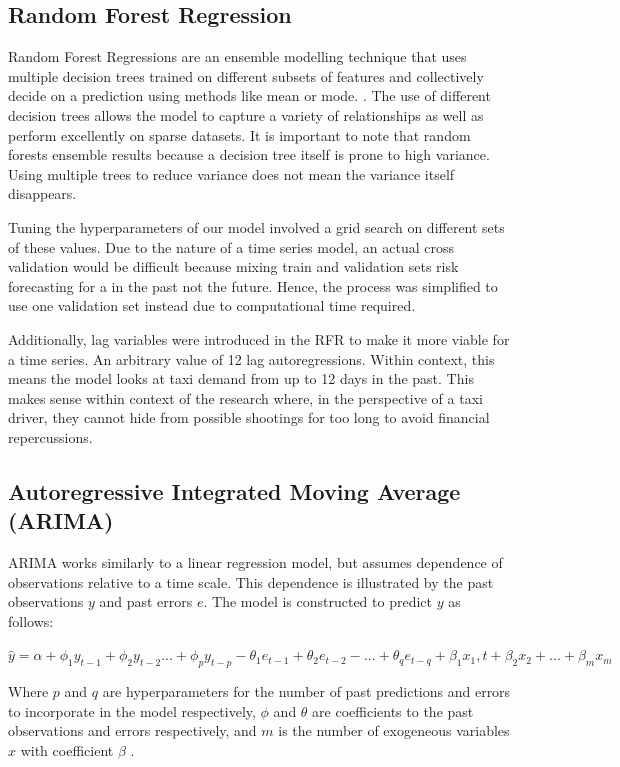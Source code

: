 \documentclass[11pt]{article}
\begin{document}
\subsection{Random Forest Regression}

Random Forest Regressions are an ensemble modelling technique that uses multiple decision trees trained on different subsets of features and collectively decide on a prediction using methods like mean or mode. \cite{randomforest}. The use of different decision trees allows the model to capture a variety of relationships as well as perform excellently on sparse datasets. It is important to note that random forests ensemble results because a decision tree itself is prone to high variance. Using multiple trees to reduce variance does not mean the variance itself disappears. 

Tuning the hyperparameters of our model involved a grid search on different sets of these values. Due to the nature of a time series model, an actual cross validation would be difficult because mixing train and validation sets risk forecasting for a in the past not the future. Hence, the process was simplified to use one validation set instead due to computational time required.

Additionally, lag variables were introduced in the RFR to make it more viable for a time series. An arbitrary value of 12 lag autoregressions. Within context, this means the model looks at taxi demand from up to 12 days in the past. This makes sense within context of the research where, in the perspective of a taxi driver, they cannot hide from possible shootings for too long to avoid financial repercussions.

\subsection{Autoregressive Integrated Moving Average (ARIMA)}
ARIMA works similarly to a linear regression model, but assumes dependence of observations relative to a time scale. This dependence is illustrated by the past observations $y$ and past errors $e$. The model is constructed to predict $y$ as follows:\
\begin{center}
    $\hat{y} = \alpha + \phi_{1} y_{t-1} + \phi_{2} y_{t-2} ... + \phi_{p} y_{t-p} - \theta_{1}e_{t-1} + \theta_{2}e_{t-2} - ... + \theta_{q}e_{t-q} + \beta_{1} x_{1},t + \beta_{2} x_{2} + ... + \beta_{m} x_{m}$
\end{center}
Where $p$ and $q$ are hyperparameters for the number of past predictions and errors to incorporate in the model respectively, $\phi$ and $\theta$ are coefficients to the past observations and errors respectively, and $m$ is the number of exogeneous variables $x$ with coefficient $\beta$ \cite{duke}.
\end{document}
